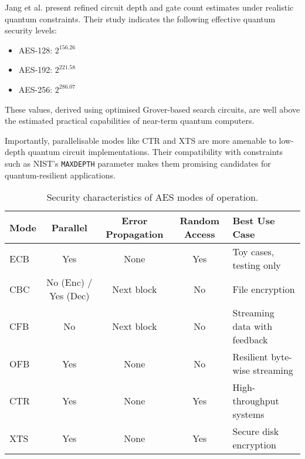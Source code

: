 \noindent Jang et al.\cite{Jang2025} present refined circuit depth and gate count estimates under realistic quantum constraints. 
Their study indicates the following effective quantum security levels:

\begin{itemize}
    \item AES-128: $2^{156.26}$
    \item AES-192: $2^{221.58}$
    \item AES-256: $2^{286.07}$
\end{itemize} 

\noindent These values, derived using optimised Grover-based search circuits, 
are well above the estimated practical capabilities of near-term quantum computers\cite{Jang2025}. \newline

\noindent Importantly, parallelisable modes like CTR and XTS are more amenable to low-depth quantum circuit implementations. 
Their compatibility with constraints such as NIST’s \texttt{MAXDEPTH} parameter makes them promising candidates for quantum-resilient applications\cite{Jang2025}.

\begin{table}[h]
\centering
\begin{tabular}{|l|c|c|c|l|}
\hline
\textbf{Mode} & \textbf{Parallel} & \textbf{Error Propagation} & \textbf{Random Access} & \textbf{Best Use Case} \\
\hline
ECB & Yes & None & Yes & Toy cases, testing only \\
CBC & No (Enc) / Yes (Dec) & Next block & No & File encryption \\
CFB & No & Next block & No & Streaming data with feedback \\
OFB & Yes & None & No & Resilient byte-wise streaming \\
CTR & Yes & None & Yes & High-throughput systems \\
XTS & Yes & None & Yes & Secure disk encryption \\
\hline
\end{tabular}
\caption{Security characteristics of AES modes of operation.}
\end{table}